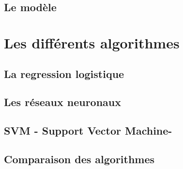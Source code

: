 \subsection{Le modèle}
\label{Le Machine Learning: Généralités sur le Machine Learning: Le modèle}


\section{Les différents algorithmes}
\label{ILe Machine Learning: Les différents algorithmes}

\subsection{La regression logistique}
\label{ILe Machine Learning: Les différents algorithmes: La regression logistique}

\subsection{Les réseaux neuronaux}
\label{ILe Machine Learning: Les différents algorithmes: Les réseaux neuronaux}

\subsection{SVM - Support Vector Machine-}
\label{ILe Machine Learning: Les différents algorithmes: SVM}

\subsection{Comparaison des algorithmes}
\label{ILe Machine Learning: Les différents algorithmes: Comparaison des algorithmes}